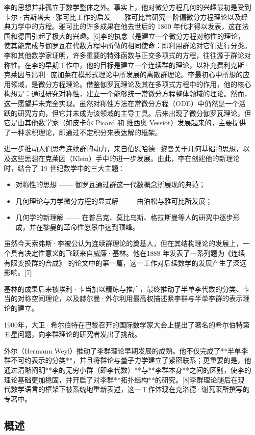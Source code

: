 李的思想并非孤立于数学整体之外。事实上，他对微分方程几何的兴趣最初是受到卡尔·古斯塔夫·雅可比工作的启发——雅可比曾研究一阶偏微分方程理论以及经典力学中的方程。雅可比的许多成果在他去世后的 1860 年代才得以发表，这在法国和德国引起了极大的兴趣。[6]李的执念（是建立一个微分方程对称性的理论，使其能完成与伽罗瓦在代数方程中所做的相同使命：即利用群论对它们进行分类。李和其他数学家证明，许多重要的特殊函数与正交多项式的方程，往往源于群论对称性。在李的早期工作中，他的目标是建立一个连续群的理论，以补充费利克斯·克莱因与昂利·庞加莱在模形式理论中所发展的离散群理论。李最初心中所想的应用领域，是微分方程理论。借鉴伽罗瓦理论及其在多项式方程中的作用，他的核心构想是：通过研究对称性，建立一个能够统一常微分方程整体领域的理论。然而，这一愿望并未完全实现。虽然对称性方法在常微分方程（ODE）中仍然是一个活跃的研究方向，但它并未成为该领域的主导工具。后来出现了微分伽罗瓦理论，但它是由其他数学家（如皮卡尔 Picard 和 维西奥 Vessiot）发展起来的，主要提供了一种求积理论，即通过不定积分来表达解的框架。

进一步推动人们思考连续群的动力，来自伯恩哈德·黎曼关于几何基础的思想，以及这些思想在克莱因（Klein）手中的进一步发展。由此，李在创建他的新理论时，结合了 19 世纪数学中的三大主题：

\begin{itemize}
\item 对称性的思想 —— 伽罗瓦通过群这一代数概念所展现的典范；
\item 几何理论与力学微分方程的显式解 —— 由泊松与雅可比所发展；
\item 几何学的新理解 —— 在普吕克、莫比乌斯、格拉斯曼等人的研究中逐步形成，并在黎曼的革命性愿景中达到顶峰。
\end{itemize}
虽然今天索弗斯·李被公认为连续群理论的奠基人，但在其结构理论的发展上，一个具有决定性意义的飞跃来自威廉·基林。他在1888 年发表了一系列题为《连续有限变换群的合成》 的论文中的第一篇，这一工作对后续数学的发展产生了深远影响。[7]

基林的成果后来被埃利·卡当加以精炼与推广，最终推动了半单李代数的分类、卡当的对称空间理论，以及赫尔曼·外尔利用最高权描述紧李群与半单李群的表示理论的建立。

1900年，大卫·希尔伯特在巴黎召开的国际数学家大会上提出了著名的希尔伯特第五星问题，向李群理论的研究者发出了挑战。

外尔（Hermann Weyl）推动了李群理论早期发展的成熟。他不仅完成了**半单李群不可约表示的分类**，并且将群论与量子力学建立了紧密联系；更重要的是，他通过清晰阐明**李的无穷小群（即李代数）**与**李群本身**之间的区别，使李的理论基础更加稳固，并开启了对李群**拓扑结构**的研究。[8]李群理论随后在现代数学语言的框架下被系统地重新表述，这一工作体现在克洛德·谢瓦莱所撰写的专著中。
\subsection{概述}